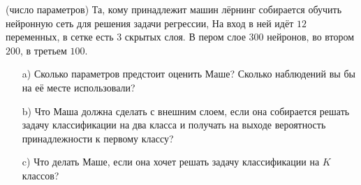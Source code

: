 \documentclass[12pt, a4paper, oneside]{article}
\theoremstyle{plain} %
\theoremstyle{definition}
\begin{document}
\begin{problem}{(число параметров)}
	Та, кому принадлежит машин лёрнинг собирается обучить нейронную сеть для решения задачи регрессии, На вход в ней идёт $12$ переменных, в сетке есть $3$ скрытых слоя. В пером слое $300$ нейронов, во втором $200$, в третьем $100$. 
	
	\begin{itemize}
		\item[a)] Сколько параметров предстоит оценить Маше?  Сколько наблюдений вы бы на её месте использовали? 
		\item[b)] Что Маша должна сделать с внешним слоем, если она собирается решать задачу классификации на два класса и получать на выходе вероятность принадлежности к первому классу? 
		\item[c)]  Что делать Маше, если она хочет решать задачу классификации на $K$ классов? 
	\end{itemize}
\end{problem}
\end{document}
